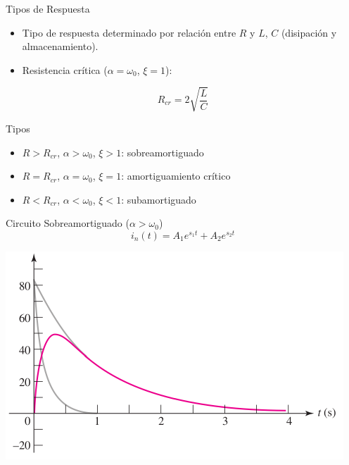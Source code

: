 \documentclass[aspectratio=169, usenames,svgnames,dvipsnames]{beamer}
\begin{document}
\begin{frame}[label={sec:orgca2178d}]{Tipos de Respuesta}
\begin{itemize}
\item Tipo de respuesta determinado por relación entre \(R\) y \(L\), \(C\) (disipación y almacenamiento).
\item Resistencia crítica (\(\alpha = \omega_0\), \(\xi = 1\)):
\end{itemize}

\[
  R_{cr} = 2\sqrt{\frac{L}{C}}
\]
\begin{block}{Tipos}
\begin{itemize}
\item \(R > R_{cr}\), \(\alpha > \omega_0\), \(\xi > 1\): \alert{sobreamortiguado}
\item \(R = R_{cr}\),  \(\alpha = \omega_0\), \(\xi = 1\): \alert{amortiguamiento crítico}
\item \(R < R_{cr}\),  \(\alpha < \omega_0\), \(\xi < 1\): \alert{subamortiguado}
\end{itemize}
\end{block}
\end{frame}
\begin{frame}[label={sec:org516587e}]{Circuito Sobreamortiguado (\(\alpha > \omega_0\))}
\[
  \boxed{i_n(t) = A_1 e^{s_1 t} + A_2 e^{s_2 t}}
\]
\begin{center}
\includegraphics[height=0.65\textheight]{../figs/Sobreamortiguado_HKD.pdf}
\end{center}
\end{frame}
\end{document}

